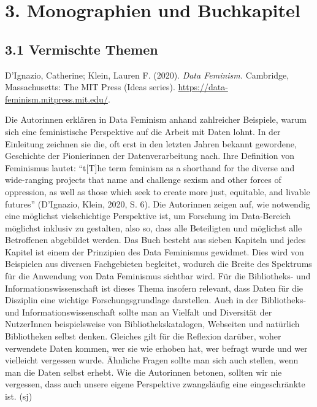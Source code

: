 \documentclass[a4paper,
fontsize=11pt,
oneside,
numbers=noperiodatend,
parskip=half-,
bibliography=totoc,
final
]{scrartcl}
\begin{document}
\hypertarget{monographien-und-buchkapitel}{%
\section{3. Monographien und
Buchkapitel}\label{monographien-und-buchkapitel}}

\hypertarget{vermischte-themen-1}{%
\subsection{3.1 Vermischte Themen}\label{vermischte-themen-1}}

D'Ignazio, Catherine; Klein, Lauren F. (2020). \emph{Data Feminism.}
Cambridge, Massachusetts: The MIT Press (Ideas series).
\url{https://data-feminism.mitpress.mit.edu/}.

Die Autorinnen erklären in Data Feminism anhand zahlreicher Beispiele,
warum sich eine feministische Perspektive auf die Arbeit mit Daten
lohnt. In der Einleitung zeichnen sie die, oft erst in den letzten
Jahren bekannt gewordene, Geschichte der Pionierinnen der
Datenverarbeitung nach. Ihre Definition von Feminismus lautet:
\enquote{t{[}T{]}he term feminism as a shorthand for the diverse and
wide-ranging projects that name and challenge sexism and other forces of
oppression, as well as those which seek to create more just, equitable,
and livable futures} (D'Ignazio, Klein, 2020, S. 6). Die Autorinnen
zeigen auf, wie notwendig eine möglichst vielschichtige Perspektive ist,
um Forschung im Data-Bereich möglichst inklusiv zu gestalten, also so,
dass alle Beteiligten und möglichst alle Betroffenen abgebildet werden.
Das Buch besteht aus sieben Kapiteln und jedes Kapitel ist einem der
Prinzipien des Data Feminismus gewidmet. Dies wird von Beispielen aus
diversen Fachgebieten begleitet, wodurch die Breite des Spektrums für
die Anwendung von Data Feminismus sichtbar wird. Für die Bibliotheks-
und Informationswissenschaft ist dieses Thema insofern relevant, dass
Daten für die Disziplin eine wichtige Forschungsgrundlage darstellen.
Auch in der Bibliotheks- und Informationswissenschaft sollte man an
Vielfalt und Diversität der NutzerInnen beispielsweise von
Bibliothekskatalogen, Webseiten und natürlich Bibliotheken selbst
denken. Gleiches gilt für die Reflexion darüber, woher verwendete Daten
kommen, wer sie wie erhoben hat, wer befragt wurde und wer vielleicht
vergessen wurde. Ähnliche Fragen sollte man sich auch stellen, wenn man
die Daten selbst erhebt. Wie die Autorinnen betonen, sollten wir nie
vergessen, dass auch unsere eigene Perspektive zwangsläufig eine
eingeschränkte ist. (sj)
\end{document}
